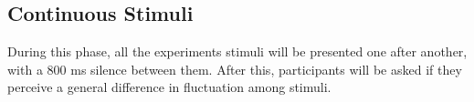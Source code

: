 \documentclass[a4paper]{article}
\begin{document}

\subsection{Continuous Stimuli} %
\label{sub:continuous_stimuli}

During this phase, all the experiment\textquotesingle s stimuli will be
presented one after another, with a 800 ms silence between them. After this,
participants will be asked if they perceive a general difference in fluctuation
among stimuli.


\end{document}
